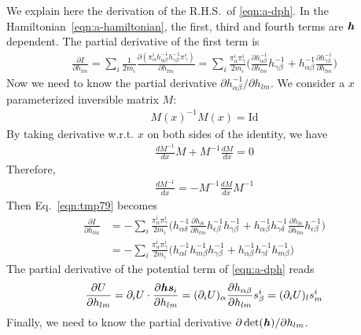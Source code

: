 \documentclass[aps, pre, preprint,unsortedaddress,a4paper,onecolumn]{revtex4}
\newcommand{\vect}[1]{\textbf{\textit{#1}}}
\begin{document}
We explain here the derivation of the R.H.S.~of \eqref{eqn:a-dph}. In
the Hamiltonian~\eqref{eqn:a-hamiltonian}, the first, third and fourth
terms are $\vect h$ dependent. The partial derivative of the first term is
\begin{align}\label{eqn:tmp79}
  \frac{\partial{I}}{\partial h_{lm}}
  = \sum_i\frac1{2m_i} \frac{\partial (\pi^i_\alpha h^{-1}_{\alpha\beta}h^{-1}_{\gamma\beta}\pi^i_{\gamma})}{\partial h_{lm}}
  = \sum_i\frac{\pi^i_\alpha\pi^i_\gamma}{2m_i} \Big( \frac{\partial h^{-1}_{\alpha\beta}}{\partial h_{lm}} h^{-1}_{\gamma\beta} + h^{-1}_{\alpha\beta} \frac{\partial h^{-1}_{\gamma\beta}}{\partial h_{lm}} \Big)
\end{align}
Now we need to know the partial derivative $\partial h^{-1}_{\alpha\beta}/ \partial h_{lm}$. We consider a $x$ parameterized inversible matrix $M$:
\begin{align}
  M(x)^{-1}M(x) = \textrm{Id}
\end{align}
By taking derivative w.r.t. $x$ on both sides of the identity, we have
\begin{align}
  \frac{dM^{-1}}{dx} M + M^{-1} \frac{dM}{dx} = 0
\end{align}
Therefore,
\begin{align}
  \frac{dM^{-1}}{dx} = - M^{-1} \frac{dM}{dx} M^{-1}
\end{align}
Then Eq.~\eqref{eqn:tmp79} becomes
\begin{align}\nonumber
  \frac{\partial{I}}{\partial h_{lm}}
  &= - \sum_i\frac{\pi^i_\alpha\pi^i_\gamma}{2m_i}
    \Big(
    h^{-1}_{\alpha\delta} \frac{\partial h_{\delta\epsilon}}{\partial h_{lm}} h^{-1}_{\epsilon\beta}h^{-1}_{\gamma\beta} 
    +
    h^{-1}_{\alpha\beta} h^{-1}_{\gamma\delta}\frac{\partial h_{\delta\epsilon}}{\partial h_{lm}} h^{-1}_{\epsilon\beta}
    \Big)   \\
  &= - \sum_i\frac{\pi^i_\alpha\pi^i_\gamma}{2m_i}
    \Big(
    h^{-1}_{\alpha l}  h^{-1}_{ m\beta}h^{-1}_{\gamma\beta} 
    +
    h^{-1}_{\alpha\beta} h^{-1}_{\gamma l}  h^{-1}_{ m\beta}
    \Big)   
\end{align}
The partial derivative of the potential term of \eqref{eqn:a-dph} reads
\begin{align}
  \frac{\partial U}{\partial h_{lm}} = \partial_i U \cdot  \frac{\partial \vect h\vect s_i}{\partial h_{lm}}
  = (\partial_i U)_\alpha \frac{\partial h_{\alpha\beta}}{\partial h_{lm}} s^i_{\beta}
  = (\partial_i U)_l  s^i_{m}
\end{align}
Finally, we need to know the partial derivative $\partial \det(\vect h)/\partial h_{lm}$.
\end{document}
